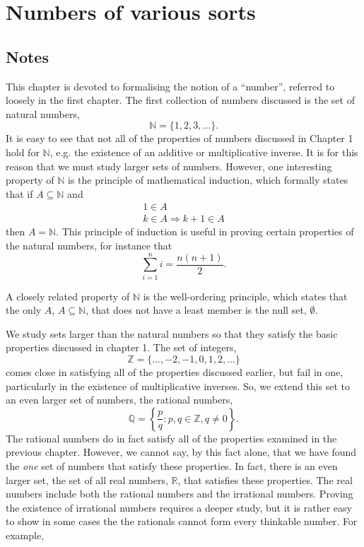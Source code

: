 \section{Numbers of various sorts}

\subsection{Notes}
This chapter is devoted to formalising the notion of a ``number'', referred to loosely in the first chapter. The first collection of numbers discussed is the set of natural numbers,
\[ \mathbb{N} = \{1, 2, 3, \ldots\}. \]
It is easy to see that not all of the properties of numbers discussed in Chapter 1 hold for $\mathbb{N}$, e.g. the existence of an additive or multiplicative inverse. It is for this reason that we must study larger sets of numbers. However, one interesting property of $\mathbb{N}$ is the principle of mathematical induction, which formally states that if $A \subseteq \mathbb{N}$ and
\begin{eqnarray}
1 \in A \\
k \in A \Rightarrow k + 1 \in A
\end{eqnarray}
then $A = \mathbb{N}$. This principle of induction is useful in proving certain properties of the natural numbers, for instance that
\[ \sum_{i=1}^n i = \frac{n(n+1)}{2}. \]

A closely related property of $\mathbb{N}$ is the well-ordering principle, which states that the only $A$, $A \subseteq \mathbb{N}$, that does not have a least member is the null set, $\emptyset$.

We study sets larger than the natural numbers so that they satisfy the basic properties discussed in chapter 1. The set of integers,
\[ \mathbb{Z} = \{\ldots, -2, -1, 0, 1, 2, \ldots\} \]
comes close in satisfying all of the properties discussed earlier, but fail in one, particularly in the existence of multiplicative inverses. So, we extend this set to an even larger set of numbers, the rational numbers,
\[ \mathbb{Q} = \left\{ \frac{p}{q}: p,q \in \mathbb{Z}, q \ne 0 \right\}. \]
The rational numbers do in fact satisfy all of the properties examined in the previous chapter. However, we cannot say, by this fact alone, that we have found the \textit{one} set of numbers that satisfy these properties. In fact, there is an even larger set, the set of all real numbers, $\mathbb{R}$, that satisfies these properties. The real numbers include both the rational numbers and the irrational numbers. Proving the existence of irrational numbers requires a deeper study, but it is rather easy to show in some cases the the rationals cannot form every thinkable number. For example,

